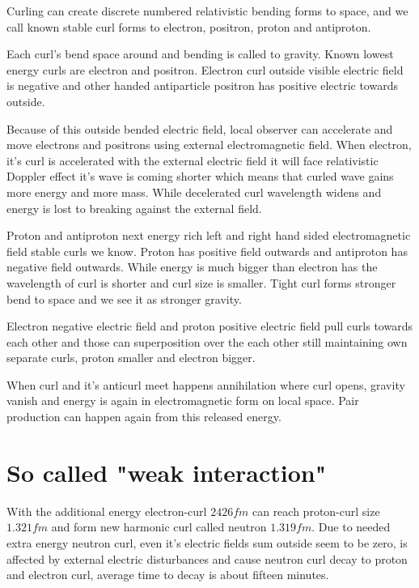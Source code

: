 Curling can create discrete numbered relativistic bending forms to space, and
we call known stable curl forms to electron, positron, proton and antiproton.

Each curl's bend space around and bending is called to gravity. Known lowest
energy curls are electron and positron. Electron curl outside visible electric
field is negative and other handed antiparticle positron has positive electric
towards outside.

Because of this outside bended electric field, local observer can accelerate
and move electrons and positrons using external electromagnetic field. When
electron, it's curl is accelerated with the external electric field it will
face relativistic Doppler effect it's wave is coming shorter which means that
curled wave gains more energy and more mass. While decelerated curl wavelength
widens and energy is lost to breaking against the external field.

Proton and antiproton next energy rich left and right hand sided
electromagnetic field stable curls we know. Proton has positive field outwards
and antiproton has negative field outwards. While energy is much bigger than
electron has the wavelength of curl is shorter and curl size is smaller. Tight
curl forms stronger bend to space and we see it as stronger gravity.

Electron negative electric field and proton positive electric field pull curls
towards each other and those can superposition over the each other still
maintaining own separate curls, proton smaller and electron bigger. %

When curl and it's anticurl meet happens annihilation\cite{Annihilation} where
curl opens, gravity vanish and energy is again in electromagnetic form on
local space. Pair production\cite{PairProduction} can happen again from this
released energy.

\section{So called "weak interaction"}
\label{weak_interaction}

With the additional energy electron-curl $2426fm$\cite{ComptonWavelength}
can reach proton-curl size $1.321fm$ and form new harmonic curl called neutron
$1.319fm$. Due to needed extra energy neutron curl, even it's electric fields
sum outside seem to be zero, is affected by external electric disturbances and
cause neutron curl decay to proton and electron curl, average time to decay is
about fifteen minutes.

